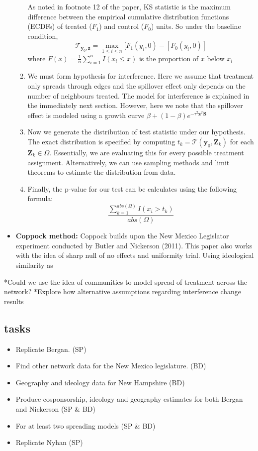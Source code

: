 \documentclass[12pt]{article}
\begin{document}
\begin{itemize}
\begin{enumerate}
As noted in footnote 12 of the paper, KS statistic is the maximum difference between the empirical cumulative distribution functions (ECDFs) of treated ($F_1$) and control ($F_0$) units. So under the baseline condition, $$\mathcal{T}_{\textbf{y}_0, \textbf{z}} = \max\limits_{1\leq i\leq n} [F_{1}(y_i, 0) - [F_{0}(y_i, 0)]$$ where $F(x) = \frac{1}{n} \sum_{i=1}^{n} I(x_i  \leq x)$ is the proportion of $x$ below $x_i$

\item We must form hypothesis for interference. Here we assume that treatment only spreads through edges and the spillover effect only depends on the number of neighbours treated. The model for interference is explained in the immediately next section. However, here we note that the spillover effect is modeled using a growth curve $\beta + (1-\beta)e^{-\tau^2\textbf{z}^T\textbf{S}}$

\item Now we generate the distribution of test statistic under our hypothesis. The exact distribution is specified by computing $t_k = \mathcal{T} (\textbf{y}_0, \textbf{Z}_k)$ for each $\textbf{Z}_k \in \Omega$. Essentially, we are evaluating this for every possible treatment assignment. Alternatively, we can use sampling methods and limit theorems to estimate the distribution from data.

\item Finally, the p-value for our test can be calculates using the following formula: $$\frac{\sum_{k=1}^{abs(\Omega)} I(x_i  > t_k)}{abs(\Omega)}$$

\end{enumerate}

\item {\bf Coppock method:} Coppock builds upon the New Mexico Legislator experiment conducted by Butler and Nickerson (2011). This paper also works with the idea of sharp null of no effects and uniformity trial. Using ideological similarity as

\end{itemize}


*Could we use the idea of communities to model spread of treatment across the network?
*Explore how alternative assumptions regarding interference change results



\subsection{tasks}
\begin{itemize}
\item Replicate Bergan. (SP)
\item Find other network data for the New Mexico legislature. (BD)
\item Geography and ideology data for New Hampshire (BD)
\item Produce cosponsorship, ideology and geography estimates for both Bergan and Nickerson (SP \& BD)
\item For at least two spreading models (SP \& BD)
\item Replicate Nyhan (SP)
\end{itemize}
\end{document}

